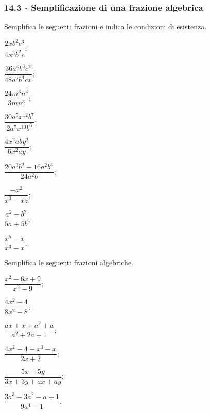 \subsubsection*{14.3 - Semplificazione di una frazione algebrica}

\begin{esercizio}[\Ast]
\label{ese:14.3}
Semplifica le seguenti frazioni e indica le condizioni di esistenza.
\begin{multicols}{3}
\begin{enumeratea}
 \item $\dfrac{2xb^{2}c^{3}}{4x^{3}b^{2}c}$;
 \item $\dfrac{36a^{4}b^{3} c^{2}}{48a^{2}b^{4}cx}$;
 \item $\dfrac{24m^{3}n^{4}}{3mn^{3}}$;
 \item $\dfrac{30a^{5}x^{12}b^{7}}{2a^{7}x^{10}b^{6}}$;
 \item $\dfrac{4x^{2}aby^{2}}{6x^{2}ay}$;
 \item $\dfrac{20a^{3}b^{2}-16a^{2}b^{3}}{24a^{2}b}$;
 \item $\dfrac{-x^{2}}{x^{3}-xz}$;
 \item $\dfrac{a^{2}-b^{2}}{5a+5b}$;
 \item $\dfrac{x^{5}-x}{x^{3}-x}$.
\end{enumeratea}
\end{multicols}
\end{esercizio}

\begin{esercizio}[\Ast]
\label{ese:14.4}
Semplifica le seguenti frazioni algebriche.
\begin{multicols}{3}
\begin{enumeratea}
 \item $\dfrac{x^{2}-6x+9}{x^{2}-9}$;
 \item $\dfrac{4x^{2}-4}{8x^{2}-8}$;
 \item $\dfrac{ax+x+a^{2}+a}{a^{2}+2a+1}$;
 \item $\dfrac{4x^{2}-4+x^{3}-x}{2x+2}$;
 \item $\dfrac{5x+5y}{3x+3y+ax+ay}$;
 \item $\dfrac{3a^{3}-3a^{2}-a+1}{9a^{4}-1}$.
\end{enumeratea}
\end{multicols}
\end{esercizio}

